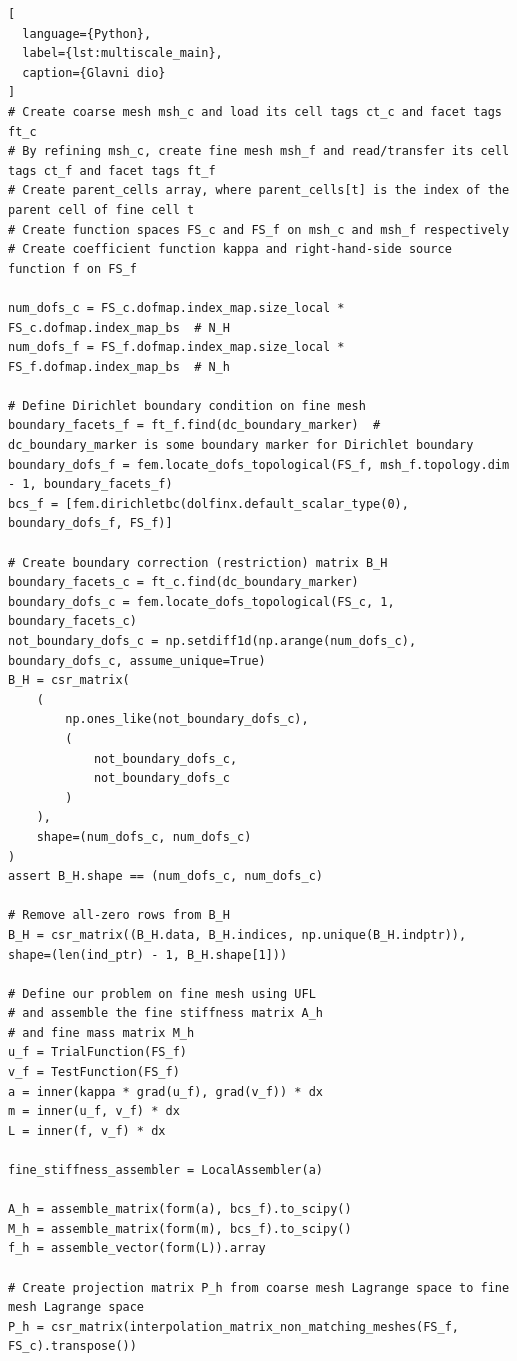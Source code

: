 \documentclass[zavrsnirad]{fer}
\begin{document}
\begin{lstlisting}[
  language={Python},
  label={lst:multiscale_main},
  caption={Glavni dio}
]
# Create coarse mesh msh_c and load its cell tags ct_c and facet tags ft_c
# By refining msh_c, create fine mesh msh_f and read/transfer its cell tags ct_f and facet tags ft_f
# Create parent_cells array, where parent_cells[t] is the index of the parent cell of fine cell t
# Create function spaces FS_c and FS_f on msh_c and msh_f respectively
# Create coefficient function kappa and right-hand-side source function f on FS_f

num_dofs_c = FS_c.dofmap.index_map.size_local * FS_c.dofmap.index_map_bs  # N_H
num_dofs_f = FS_f.dofmap.index_map.size_local * FS_f.dofmap.index_map_bs  # N_h

# Define Dirichlet boundary condition on fine mesh
boundary_facets_f = ft_f.find(dc_boundary_marker)  # dc_boundary_marker is some boundary marker for Dirichlet boundary
boundary_dofs_f = fem.locate_dofs_topological(FS_f, msh_f.topology.dim - 1, boundary_facets_f)
bcs_f = [fem.dirichletbc(dolfinx.default_scalar_type(0), boundary_dofs_f, FS_f)]

# Create boundary correction (restriction) matrix B_H
boundary_facets_c = ft_c.find(dc_boundary_marker)
boundary_dofs_c = fem.locate_dofs_topological(FS_c, 1, boundary_facets_c)
not_boundary_dofs_c = np.setdiff1d(np.arange(num_dofs_c), boundary_dofs_c, assume_unique=True)
B_H = csr_matrix(
    (
        np.ones_like(not_boundary_dofs_c),
        (
            not_boundary_dofs_c,
            not_boundary_dofs_c
        )
    ),
    shape=(num_dofs_c, num_dofs_c)
)
assert B_H.shape == (num_dofs_c, num_dofs_c)

# Remove all-zero rows from B_H
B_H = csr_matrix((B_H.data, B_H.indices, np.unique(B_H.indptr)), shape=(len(ind_ptr) - 1, B_H.shape[1]))

# Define our problem on fine mesh using UFL
# and assemble the fine stiffness matrix A_h
# and fine mass matrix M_h
u_f = TrialFunction(FS_f)
v_f = TestFunction(FS_f)
a = inner(kappa * grad(u_f), grad(v_f)) * dx
m = inner(u_f, v_f) * dx
L = inner(f, v_f) * dx

fine_stiffness_assembler = LocalAssembler(a)

A_h = assemble_matrix(form(a), bcs_f).to_scipy()
M_h = assemble_matrix(form(m), bcs_f).to_scipy()
f_h = assemble_vector(form(L)).array

# Create projection matrix P_h from coarse mesh Lagrange space to fine mesh Lagrange space
P_h = csr_matrix(interpolation_matrix_non_matching_meshes(FS_f, FS_c).transpose())


\end{lstlisting}
\end{document}
